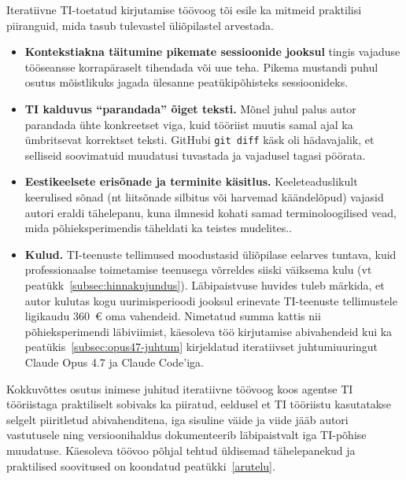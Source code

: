 Iteratiivne TI-toetatud kirjutamise töövoog tõi esile ka mitmeid praktilisi piiranguid, mida tasub tulevastel üliõpilastel arvestada.

\begin{itemize}
    \item \textbf{Kontekstiakna täitumine pikemate sessioonide jooksul} tingis vajaduse tööseansse korrapäraselt tihendada või uue teha. Pikema mustandi puhul osutus mõistlikuks jagada ülesanne peatükipõhisteks sessioonideks.
    \item \textbf{TI kalduvus ``parandada'' õiget teksti.} Mõnel juhul palus autor parandada ühte konkreetset viga, kuid tööriist muutis samal ajal ka ümbritsevat korrektset teksti. GitHubi \texttt{git diff} käsk oli hädavajalik, et selliseid soovimatuid muudatusi tuvastada ja vajadusel tagasi pöörata.
    \item \textbf{Eestikeelsete erisõnade ja terminite käsitlus.} Keeleteaduslikult keerulised sõnad (nt liitsõnade silbitus või harvemad käändelõpud) vajasid autori eraldi tähelepanu, kuna ilmnesid kohati samad terminoloogilised vead, mida põhieksperimendis täheldati ka teistes mudelites..
    \item \textbf{Kulud.} TI-teenuste tellimused moodustasid üliõpilase eelarves tuntava, kuid professionaalse toimetamise teenusega võrreldes siiski väiksema kulu (vt peatükk~\ref{subsec:hinnakujundus}). Läbipaistvuse huvides tuleb märkida, et autor kulutas kogu uurimisperioodi jooksul erinevate TI-teenuste tellimustele ligikaudu 360~€ oma vahendeid. Nimetatud summa kattis nii põhieksperimendi läbiviimist, käesoleva töö kirjutamise abivahendeid kui ka peatükis~\ref{subsec:opus47-juhtum} kirjeldatud iteratiivset juhtumiuuringut Claude Opus 4.7 ja Claude Code'iga.
\end{itemize}

Kokkuvõttes osutus inimese juhitud iteratiivne töövoog koos agentse TI tööriistaga praktiliselt sobivaks ka piiratud, eeldusel et TI tööriistu kasutatakse selgelt piiritletud abivahenditena, iga sisuline väide ja viide jääb autori vastutusele ning versioonihaldus dokumenteerib läbipaistvalt iga TI-põhise muudatuse. Käesoleva töövoo põhjal tehtud üldisemad tähelepanekud ja praktilised soovitused on koondatud peatükki~\ref{arutelu}.
